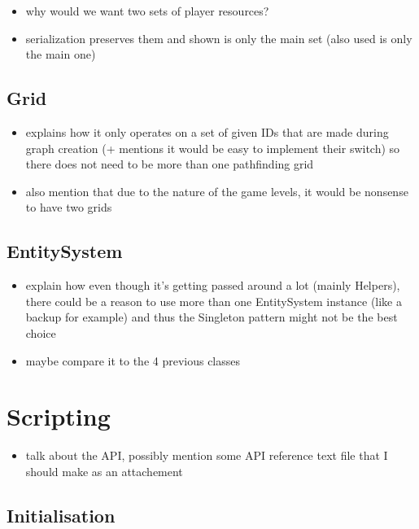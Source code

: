 \begin{itemize}
    \item why would we want two sets of player resources?
    \item serialization preserves them and shown is only the main set
        (also used is only the main one)
\end{itemize}

\subsection{Grid}

\begin{itemize}
    \item explains how it only operates on a set of given IDs that are
        made during graph creation (+ mentions it would be easy to implement
        their switch) so there does not need to be more than one pathfinding grid
    \item also mention that due to the nature of the game levels, it would be nonsense
        to have two grids
\end{itemize}

\subsection{EntitySystem}

\begin{itemize}
    \item explain how even though it's getting passed around a lot (mainly Helpers),
        there could be a reason to use more than one EntitySystem instance (like a backup
        for example) and thus the Singleton pattern might not be the best choice
    \item maybe compare it to the 4 previous classes
\end{itemize}

\section{Scripting}

\begin{itemize}
    \item talk about the API, possibly mention some API reference text file
        that I should make as an attachement
\end{itemize}

\subsection{Initialisation}

